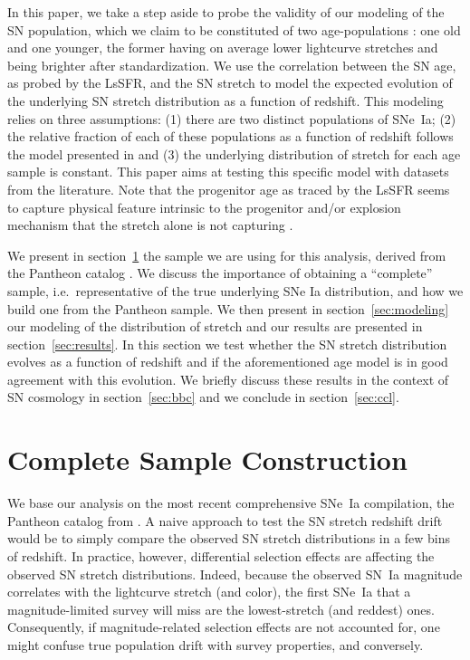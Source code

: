 \documentclass[]{aa} %
\newcommand{\mr}[1]{{\textcolor[rgb]{0.60,0.10,0.6}{#1}}}
\begin{document}
In this paper, we take a step aside to probe the validity of our modeling of the
SN population, which we claim to be constituted of two age-populations
\citep{rigault2013,rigault2015,rigault2018}: one old and one younger, the former
having on average lower lightcurve stretches and being brighter after
standardization. We use the correlation between the SN age, as probed by the LsSFR, and the SN stretch to model
the expected evolution of the underlying SN stretch distribution as a function
of redshift. This modeling relies on three assumptions: (1) there are two
distinct populations of SNe~Ia; (2) the relative fraction of each of these
populations as a function of redshift follows the model presented in
\cite{rigault2018} and (3) the underlying distribution of stretch for each age
sample is constant. This paper aims at testing this specific model with datasets from the literature. \mr{Note that the progenitor age as traced by the LsSFR seems to capture physical feature intrinsic to the progenitor and/or explosion mechanism that the stretch alone is not capturing \citep{nordin2018}.}

We present in section~\ref{sec:sample} the sample we are using for this
analysis, derived from the Pantheon catalog \citep{scolnic2018a}. We discuss the
importance of obtaining a ``complete'' sample, i.e.\ representative of the true
underlying SNe Ia distribution, and how we build one from the Pantheon sample.
We then present in section~\ref{sec:modeling} our modeling of the distribution of stretch and our results are presented in
section~\ref{sec:results}. In this section we test whether the SN stretch distribution evolves as a function of redshift and if the aforementioned age model is in good agreement with this evolution. We briefly discuss these results in the context of SN cosmology in section~\ref{sec:bbc} and we conclude in
section~\ref{sec:ccl}.

\section{Complete Sample Construction}\label{sec:sample}

We base our analysis on the most recent comprehensive SNe~Ia
compilation, the Pantheon catalog from \cite{scolnic2018a}. A naive approach to
test the SN stretch redshift drift would be to simply compare the observed SN
stretch distributions in a few bins of redshift. In practice, however, \mr{differential} selection effects are affecting the observed SN stretch
distributions. Indeed, because the observed SN~Ia magnitude correlates with the
lightcurve stretch (and color), the first SNe~Ia that a magnitude-limited survey
will miss are the lowest-stretch (and reddest) ones. Consequently, if
magnitude-related selection effects are not accounted for, one might confuse
true population drift with survey properties, and conversely.
\end{document}
